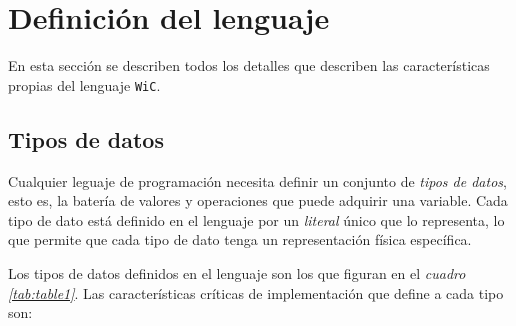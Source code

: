 \documentclass[11pt, english]{article}
\begin{document}
	\newcommand{\CC}{C\nolinebreak\hspace{-.05em}\raisebox{.4ex}{\tiny\bf +}\nolinebreak\hspace{-.10em}\raisebox{.4ex}{\tiny\bf +}}
	\def\CC{{C\nolinebreak[4]\hspace{-.05em}\raisebox{.4ex}{\tiny\bf ++}}}
	
	\tableofcontents
	\newpage
	
	\label{Resumen}
	
	\section{Definición del lenguaje}\label{Definicion-lenguaje}
	En esta sección se describen todos los detalles que describen las características propias del lenguaje \texttt{WiC}.
	
	\subsection{Tipos de datos}\label{data-type}
	Cualquier leguaje de programación necesita definir un conjunto de \emph{tipos de datos}, esto es, la batería de valores y operaciones que puede adquirir una variable. Cada tipo de dato está definido en el lenguaje por un \emph{literal} único que lo representa, lo que permite que cada tipo de dato tenga un representación física específica.
	
	Los tipos de datos definidos en el lenguaje son los que figuran en el \emph{cuadro \ref{tab:table1}}. Las características críticas de implementación que define a cada tipo son:
	
\end{document}
